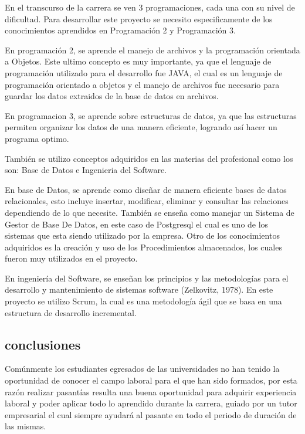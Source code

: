 \documentclass[spanish]{article}
\begin{document}
En el transcurso de la carrera se ven 3 programaciones, cada una con su nivel de dificultad. Para desarrollar este proyecto se necesito especificamente de los conocimientos aprendidos en Programación 2 y Programación 3.

En programación 2, se aprende el manejo de archivos y la programación orientada a Objetos. Este ultimo concepto es muy importante, ya que el lenguaje de programación utilizado para el desarrollo fue JAVA, el cual es un lenguaje de programación orientado a objetos y el manejo de archivos fue necesario para guardar los datos extraidos de la base de datos en archivos.

En programacion 3, se aprende sobre estructuras de datos, ya que las estructuras permiten organizar los datos de una manera eficiente, logrando así hacer un programa optimo.

También se utilizo conceptos adquiridos en las materias del profesional como los son: Base de Datos e Ingenieria del Software.

En base de Datos, se aprende como diseñar de manera eficiente bases de datos relacionales, esto incluye insertar, modificar, eliminar y consultar las relaciones dependiendo de lo que necesite. También se enseña como manejar un Sistema de Gestor de Base De Datos, en este caso de Postgresql el cual es uno de los sistemas que esta siendo utilizado por la empresa. Otro de los conocimientos adquiridos es la creación y uso de los Procedimientos almacenados, los cuales fueron muy utilizados en el proyecto.

En ingeniería del Software, se enseñan los principios y las metodologías para el desarrollo y mantenimiento de sistemas software (Zelkovitz, 1978). En este proyecto se utilizo Scrum, la cual es una metodología ágil que se basa en una estructura de desarrollo incremental.

\subsection{conclusiones}

Comúnmente los estudiantes egresados de las universidades no han tenido la oportunidad de conocer el campo laboral para el que han sido formados, por esta razón realizar pasantías resulta una buena oportunidad para adquirir experiencia laboral y poder aplicar todo lo aprendido durante la carrera, guiado por un tutor empresarial el cual siempre ayudará al pasante en todo el periodo de duración de las mismas.\\
\end{document}
